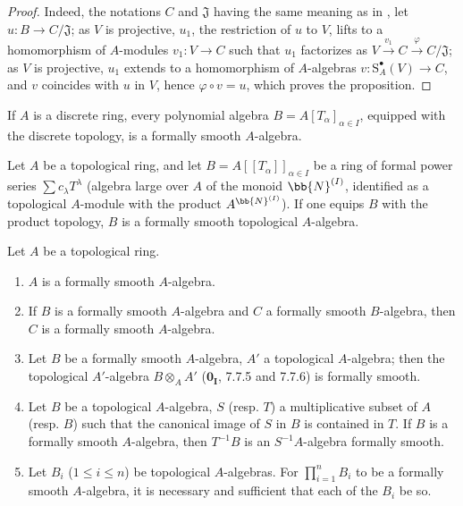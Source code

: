 \begin{proof}
Indeed, the notations $C$ and $\mathfrak{J}$ having the same meaning as in , let $u:B\to C/\mathfrak{J}$;
as $V$ is projective, $u_1$, the restriction of $u$ to $V$, lifts to a homomorphism of $A$-modules $v_1:V\to C$ such that $u_1$ factorizes as $V\xrightarrow{v_1}C\xrightarrow{\varphi}C/\mathfrak{J}$;
as $V$ is projective, $u_1$ extends to a homomorphism of $A$-algebras $v:\mathrm{S}_A^\bullet(V)\to C$, and $v$ coincides with $u$ in $V$, hence $\varphi\circ v=u$, which proves the proposition.
\end{proof}

\begin{corollary}[19.3.3]
\label{0.19.3.3}
If $A$ is a discrete ring, every polynomial algebra $B=A[T_\alpha]_{\alpha\in I}$, equipped with the discrete topology, is a formally smooth $A$-algebra.
\end{corollary}

\begin{proposition}[19.3.4]
\label{0.19.3.4}
Let $A$ be a topological ring, and let $B=A[[T_\alpha]]_{\alpha\in I}$ be a ring of formal power series $\sum c_\lambda T^\lambda$ (algebra large over $A$ of the monoid $\bb{N}^{(I)}$, identified as a topological $A$-module with the product $A^{\bb{N}^{(I)}}$).
If one equips $B$ with the product topology, $B$ is a formally smooth topological $A$-algebra.
\end{proposition}

\begin{proposition}[19.3.5]
\label{0.19.3.5}
Let $A$ be a topological ring.
\begin{enumerate}
  \item[(i)] $A$ is a formally smooth $A$-algebra.
  \item[(ii)] If $B$ is a formally smooth $A$-algebra and $C$ a formally smooth $B$-algebra, then $C$ is a formally smooth $A$-algebra.
  \item[(iii)] Let $B$ be a formally smooth $A$-algebra, $A'$ a topological $A$-algebra;
  then the topological $A'$-algebra $B\otimes_A A'$ ($\mathbf{0_I}$, 7.7.5 and 7.7.6) is formally smooth.
  \item[(iv)] Let $B$ be a topological $A$-algebra, $S$ (resp. $T$) a multiplicative subset of $A$ (resp. $B$) such that the canonical image of $S$ in $B$ is contained in $T$.
  If $B$ is a formally smooth $A$-algebra, then $T^{-1}B$ is an $S^{-1}A$-algebra formally smooth.
  \item[(v)] Let $B_i$ ($1\leq i\leq n$) be topological $A$-algebras.
  For $\prod_{i=1}^n B_i$ to be a formally smooth $A$-algebra, it is necessary and sufficient that each of the $B_i$ be so.
\end{enumerate}
\end{proposition}

